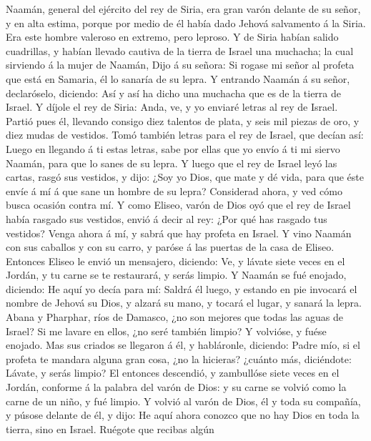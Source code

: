  Naamán, general del ejército del rey de Siria, era gran
varón delante de su señor, y en alta estima, porque por medio de él
había dado Jehová salvamento á la Siria. Era este hombre valeroso en
extremo, pero leproso.  Y de Siria habían salido cuadrillas,
y habían llevado cautiva de la tierra de Israel una muchacha; la cual
sirviendo á la mujer de Naamán,  Dijo á su señora: Si rogase
mi señor al profeta que está en Samaria, él lo sanaría de su lepra.
 Y entrando Naamán á su señor, declaróselo, diciendo: Así y
así ha dicho una muchacha que es de la tierra de Israel.  Y
díjole el rey de Siria: Anda, ve, y yo enviaré letras al rey de Israel.
Partió pues él, llevando consigo diez talentos de plata, y seis mil
piezas de oro, y diez mudas de vestidos.  Tomó también
letras para el rey de Israel, que decían así: Luego en llegando á ti
estas letras, sabe por ellas que yo envío á ti mi siervo Naamán, para
que lo sanes de su lepra.  Y luego que el rey de Israel leyó
las cartas, rasgó sus vestidos, y dijo: ¿Soy yo Dios, que mate y dé
vida, para que éste envíe á mí á que sane un hombre de su lepra?
Considerad ahora, y ved cómo busca ocasión contra mí.  Y
como Eliseo, varón de Dios oyó que el rey de Israel había rasgado sus
vestidos, envió á decir al rey: ¿Por qué has rasgado tus vestidos? Venga
ahora á mí, y sabrá que hay profeta en Israel.  Y vino
Naamán con sus caballos y con su carro, y paróse á las puertas de la
casa de Eliseo.  Entonces Eliseo le envió un mensajero,
diciendo: Ve, y lávate siete veces en el Jordán, y tu carne se te
restaurará, y serás limpio.  Y Naamán se fué enojado,
diciendo: He aquí yo decía para mí: Saldrá él luego, y estando en pie
invocará el nombre de Jehová su Dios, y alzará su mano, y tocará el
lugar, y sanará la lepra.  Abana y Pharphar, ríos de
Damasco, ¿no son mejores que todas las aguas de Israel? Si me lavare en
ellos, ¿no seré también limpio? Y volvióse, y fuése enojado.
 Mas sus criados se llegaron á él, y habláronle, diciendo:
Padre mío, si el profeta te mandara alguna gran cosa, ¿no la hicieras?
¿cuánto más, diciéndote: Lávate, y serás limpio?  El
entonces descendió, y zambullóse siete veces en el Jordán, conforme á la
palabra del varón de Dios: y su carne se volvió como la carne de un
niño, y fué limpio.  Y volvió al varón de Dios, él y toda
su compañía, y púsose delante de él, y dijo: He aquí ahora conozco que
no hay Dios en toda la tierra, sino en Israel. Ruégote que recibas algún
